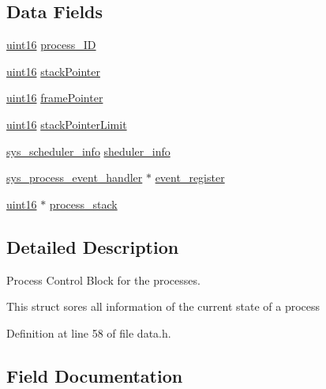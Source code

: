 \subsection*{Data Fields}
\begin{DoxyCompactItemize}
\item 
\hyperlink{definitions_8h_a05f6b0ae8f6a6e135b0e290c25fe0e4e}{uint16} \hyperlink{structsys__process__control__block__s_a3f7ec6be0e16d1ae6b123a9b2bbb7176}{process\+\_\+\+I\+D}
\item 
\hyperlink{definitions_8h_a05f6b0ae8f6a6e135b0e290c25fe0e4e}{uint16} \hyperlink{structsys__process__control__block__s_a524ae2611a8aeb602c9c3ad78f4cae97}{stack\+Pointer}
\item 
\hyperlink{definitions_8h_a05f6b0ae8f6a6e135b0e290c25fe0e4e}{uint16} \hyperlink{structsys__process__control__block__s_aef61433a4fe380bd38c45fe3ea36433c}{frame\+Pointer}
\item 
\hyperlink{definitions_8h_a05f6b0ae8f6a6e135b0e290c25fe0e4e}{uint16} \hyperlink{structsys__process__control__block__s_a6ace28a95ee3d1ae4f0e36aa2675cf51}{stack\+Pointer\+Limit}
\item 
\hyperlink{scheduler_8h_aa491087633867d367d0f0c63f75ac41a}{sys\+\_\+scheduler\+\_\+info} \hyperlink{structsys__process__control__block__s_a0ef282f8acb4718b5a896e3c7d693a4a}{sheduler\+\_\+info}
\item 
\hyperlink{data_8h_a8840f47ed02e5b3b5b9ad35c55057a45}{sys\+\_\+process\+\_\+event\+\_\+handler} $\ast$ \hyperlink{structsys__process__control__block__s_a85bf797910e44aee733a9cc53db76728}{event\+\_\+register}
\item 
\hyperlink{definitions_8h_a05f6b0ae8f6a6e135b0e290c25fe0e4e}{uint16} $\ast$ \hyperlink{structsys__process__control__block__s_a094b1d3add4317d0100c53c8bdc26553}{process\+\_\+stack}
\end{DoxyCompactItemize}


\subsection{Detailed Description}
Process Control Block for the processes. 

This struct sores all information of the current state of a process 

Definition at line 58 of file data.\+h.



\subsection{Field Documentation}
\hypertarget{structsys__process__control__block__s_a85bf797910e44aee733a9cc53db76728}{}
